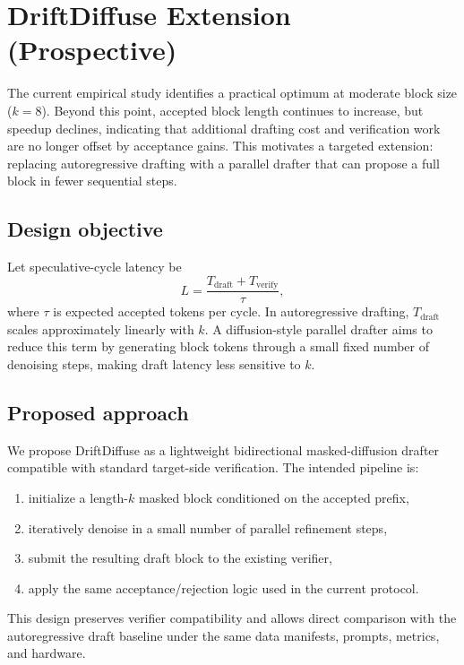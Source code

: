 \section{DriftDiffuse Extension (Prospective)}
\label{sec:driftdiffuse}

The current empirical study identifies a practical optimum at moderate block
size ($k{=}8$). Beyond this point, accepted block length continues to increase,
but speedup declines, indicating that additional drafting cost and verification
work are no longer offset by acceptance gains. This motivates a targeted
extension: replacing autoregressive drafting with a parallel drafter that can
propose a full block in fewer sequential steps.

\subsection{Design objective}

Let speculative-cycle latency be
\begin{equation}
  L = \frac{T_{\text{draft}} + T_{\text{verify}}}{\tau},
\end{equation}
where $\tau$ is expected accepted tokens per cycle. In autoregressive drafting,
$T_{\text{draft}}$ scales approximately linearly with $k$. A diffusion-style
parallel drafter aims to reduce this term by generating block tokens through a
small fixed number of denoising steps, making draft latency less sensitive to
$k$.

\subsection{Proposed approach}

We propose DriftDiffuse as a lightweight bidirectional masked-diffusion
drafter compatible with standard target-side verification. The intended
pipeline is:
\begin{enumerate}
  \item initialize a length-$k$ masked block conditioned on the accepted prefix,
  \item iteratively denoise in a small number of parallel refinement steps,
  \item submit the resulting draft block to the existing verifier,
  \item apply the same acceptance/rejection logic used in the current protocol.
\end{enumerate}

This design preserves verifier compatibility and allows direct comparison with
the autoregressive draft baseline under the same data manifests, prompts,
metrics, and hardware.

